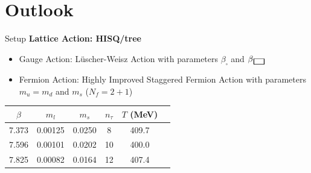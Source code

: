 \documentclass[
	english, %
	design=2023, %
	]{tudabeamer}
\newcommand{\rectangle}{{\mathbin{\scalebox{2}[1]{$\square$}}}}
\begin{document}
\section{Outlook}
\begin{frame}
\sectionpage
\end{frame}
\begin{frame}{Setup}
    \textbf{Lattice Action: HISQ/tree}
    \begin{itemize}
        \item Gauge Action: Lüscher-Weisz Action with parameters $\beta_\square$ and $\beta_\rectangle$
        \item Fermion Action: Highly Improved Staggered Fermion Action with parameters $m_u=m_d$ and $m_s$ ($N_f=2+1$)
    \end{itemize}
    \begin{table}[h]
\centering
\begin{tabular}{c c c c c c}
\hline
$\beta$ & $m_l$ & $m_s$ & $n_\tau$ & $T$ (MeV) \\
\hline
7.373 & 0.00125 & 0.0250 & 8  & 409.7 \\
7.596 & 0.00101 & 0.0202 & 10 & 400.0 \\
7.825 & 0.00082 & 0.0164 & 12 & 407.4 \\
\hline
\end{tabular}
\end{table}
        
\end{frame}
\end{document}
